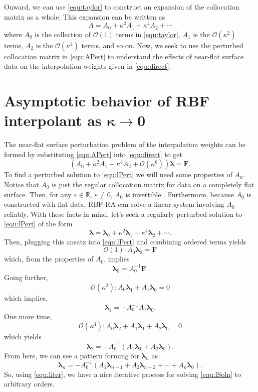 \documentclass[a4paper,11pt]{article}
\newcommand{\reals}{\mathbb{R}}
\newcommand{\eps}{\varepsilon}
\newcommand{\bigO}{\mathcal{O}}
\newcommand{\bl}{\pmb{\lambda}}
\newcommand{\bF}{\mathbf{F}}
\begin{document}
Onward, we can use \eqref{equ:taylor} to construct an expansion of the collocation matrix as a whole. This expansion can be written as
\begin{equation}
	A = A_0 + \kappa^2 A_1 + \kappa^4 A_2 + \cdots \label{equ:APert}
\end{equation}
where $ A_0 $ is the collection of $ \bigO(1) $ terms in \eqref{equ:taylor}, $ A_1 $ is the $ \bigO(\kappa^2) $ terms, $ A_2 $ is the $ \bigO(\kappa^4) $ terms, and so on. Now, we seek to use the perturbed collocation matrix in \eqref{equ:APert} to understand the effects of near-flat surface data on the interpolation weights given in \eqref{equ:direct}.

\section{Asymptotic behavior of RBF interpolant as $ \pmb{\kappa \to 0} $}

The near-flat surface perturbation problem of the interpolation weights can be formed by substituting \eqref{equ:APert} into \eqref{equ:direct} to get
\begin{equation}
	(A_0 + \kappa^2 A_1 + \kappa^4 A_2 + \bigO(\kappa^6)) \bl = \bF. \label{equ:lPert}
\end{equation}
To find a perturbed solution to \eqref{equ:lPert} we will need some properties of $ A_0 $. Notice that $ A_0 $ is just the regular collocation matrix for data on a completely flat surface. Then, for any $ \eps \in \reals $, $ \eps \neq 0 $, $ A_0 $ is invertible \cite{rbf}. Furthermore, because $ A_0 $ is constructed with flat data, RBF-RA can solve a linear system involving $ A_0 $ reliably.  With these facts in mind, let's seek a regularly perturbed solution to \eqref{equ:lPert} of the form
\begin{equation}
	\bl = \bl_0 + \kappa^2 \bl_1 + \kappa^4 \bl_2 + \cdots. \label{equ:lSoln}
\end{equation}
Then, plugging this ansatz into \eqref{equ:lPert} and combining ordered terms yields
\[
	\bigO(1): A_0 \bl_0 = \bF
\]
which, from the properties of $ A_0 $, implies
\[
	\bl_0 = A_0^{-1} \bF.
\]
Going further,
\[
	\bigO(\kappa^2): A_0 \bl_1 + A_1 \bl_0 = 0
\]
which implies,
\[
	\bl_1 = -A_0^{-1} A_1 \bl_0.
\]
One more time,
\[
	\bigO(\kappa^4): A_0 \bl_2 + A_1 \bl_1 + A_2 \bl_0 = 0
\]
which yields
\[
	\bl_2 = -A_0^{-1} (A_1 \bl_1 + A_2 \bl_0).
\]
From here, we can see a pattern forming for $ \bl_n $ as
\begin{equation}
	\bl_n = -A_0^{-1}(A_1 \bl_{n - 1} + A_2 \bl_{n - 2} + \cdots + A_n \bl_0). \label{equ:liter}
\end{equation}
So, using \eqref{equ:liter}, we have a nice iterative process for solving \eqref{equ:lSoln} to arbitrary orders. 
\end{document}
